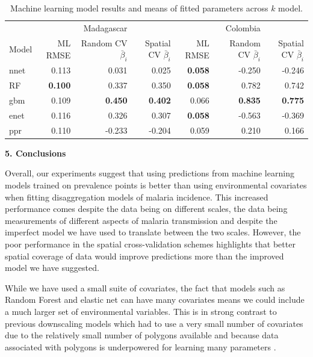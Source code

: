 \documentclass[11pt]{article}
\begin{document}
\begin{table}
\caption{Machine learning model results and means of fitted parameters across $k$ model. }
\centering
\small
\begin{tabular}{l|rrr|rrr}
               &&      Madagascar &&      &                                     Colombia&    \\
Model          & ML RMSE & Random CV $\bar{\beta}_i$ & Spatial CV $\bar{\beta}_i$  & ML RMSE & Random CV $\bar{\beta}_i$  & Spatial CV $\bar{\beta}_i$  \\
\hline
nnet           & 0.113      &  0.031         &  0.025         & \textbf{0.058}& -0.250          & -0.246          \\
RF   &  \textbf{0.100}      &  0.337         &  0.350         & \textbf{0.058}&  0.782          &  0.742          \\
gbm            & 0.109      &  \textbf{0.450}&  \textbf{0.402}& 0.066         &  \textbf{0.835} &  \textbf{0.775} \\
enet           & 0.116      &  0.326         &  0.307         & \textbf{0.058}& -0.563          & -0.369          \\
ppr            & 0.110      & -0.233         & -0.204         & 0.059         &  0.210          &  0.166          \\
\end{tabular}
\label{t:mlresults}
\end{table}




{\bf 5. Conclusions}

Overall, our experiments suggest that using predictions from machine learning models trained on prevalence points is better than using environmental covariates when fitting disaggregation models of malaria incidence.
This increased performance comes despite the data being on different scales, the data being measurements of different aspects of malaria transmission and despite the imperfect model we have used to translate between the two scales.
However, the poor performance in the spatial cross-validation schemes highlights that better spatial coverage of data would improve predictions more than the improved model we have suggested.

While we have used a small suite of covariates, the fact that models such as Random Forest and elastic net can have many covariates means we could include a much larger set of environmental variables.
This is in strong contrast to previous downscaling models which had to use a very small number of covariates due to the relatively small number of polygons available and because data associated with polygons is underpowered for learning many parameters \citep{sturrock2014fine}.
\end{document}
